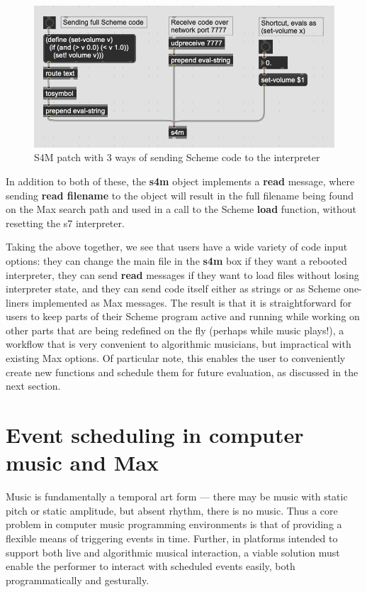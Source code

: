 \documentclass[acmsmall, anonymous, review]{acmart}
\begin{document}
\begin{figure}[H]
  \centering
  \includegraphics[width=.75\linewidth]{fig-4-code-sends}
  \caption{S4M patch with 3 ways of sending Scheme code to the interpreter}
\end{figure}


In addition to both of these, the \textbf{s4m} object implements a \textbf{read} message,
where sending \textbf{read filename} to the object will result in the full filename
being found on the Max search path and used in a call to the Scheme \textbf{load} function,
without resetting the s7 interpreter.

Taking the above together, we see that users have a wide variety of code input options:
they can change the main file in the \textbf{s4m} box if they want a rebooted interpreter,
they can send \textbf{read} messages if they want to load files without losing 
interpreter state, and they can send code itself either as strings or as Scheme
one-liners implemented as Max messages. The result is that it is straightforward
for users to keep parts of their Scheme program active and running
while working on other parts that are being redefined on the fly (perhaps while music plays!),
a workflow that is very convenient to algorithmic musicians, but impractical with existing
Max options. Of particular note, this enables the user to
conveniently create new functions and schedule them for future evaluation,
as discussed in the next section.


\section{Event scheduling in computer music and Max}

Music is fundamentally a temporal art form --- there may be music with static pitch
or static amplitude, but absent rhythm, there is no music.  
Thus a core problem in computer music programming environments is that of providing a flexible 
means of triggering events in time. Further, in platforms intended to support both
live and algorithmic musical interaction, a viable solution must enable the performer
to interact with scheduled events easily, both programmatically and gesturally. 
\end{document}
